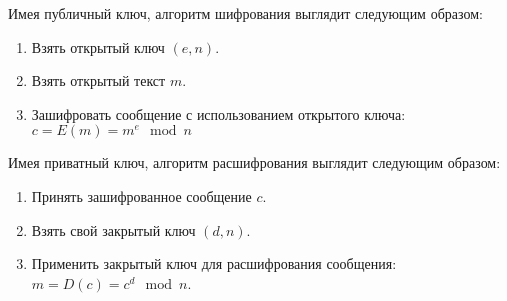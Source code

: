 Имея публичный ключ, алгоритм шифрования выглядит следующим образом:
\begin{enumerate}
	\item Взять открытый ключ \((e,n)\).
	\item Взять открытый текст \(m\).
	\item Зашифровать сообщение с использованием открытого ключа: \(c=E(m)=m^e \mod n\)
\end{enumerate}

Имея приватный ключ, алгоритм расшифрования выглядит следующим образом:
\begin{enumerate}
	\item Принять зашифрованное сообщение \(c\).
	\item Взять свой закрытый ключ \((d,n)\).
	\item Применить закрытый ключ для расшифрования сообщения: \(m=D(c)=c^d \mod n\).
\end{enumerate}